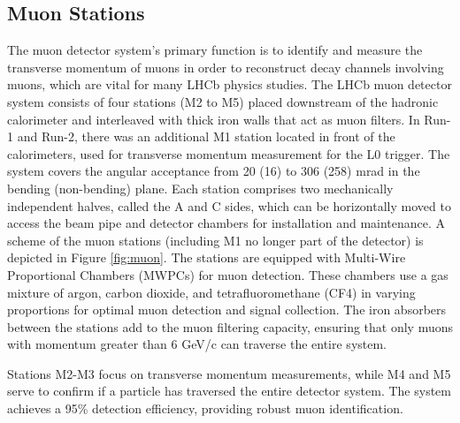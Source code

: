 \subsection{Muon Stations}
The muon detector system's primary function is to identify and measure the transverse momentum of muons in order to reconstruct decay channels involving muons, which are vital for many LHCb physics studies.
The LHCb muon detector system\cite{Alves_2013} consists of four stations (M2 to M5) placed downstream of the hadronic calorimeter and interleaved with thick iron walls that act as muon filters. In Run-1 and Run-2, there was an additional M1 station located in front of the calorimeters, used for transverse momentum measurement for the L0 trigger\cite{muon_upgrade}. The system covers the angular acceptance from 20 (16) to 306 (258) mrad in the bending (non-bending) plane. Each station comprises two mechanically independent halves, called the A and C sides, which can be horizontally moved to access the beam pipe and detector chambers for installation and maintenance.
A scheme of the muon stations (including M1 no longer part of the detector) is depicted in Figure \ref{fig:muon}.
The stations are equipped with Multi-Wire Proportional Chambers (MWPCs) for muon detection. These chambers use a gas mixture of argon, carbon dioxide, and tetrafluoromethane (CF4) in varying proportions for optimal muon detection and signal collection. The iron absorbers between the stations add to the muon filtering capacity, ensuring that only muons with momentum greater than 6 GeV/c can traverse the entire system.

Stations M2-M3 focus on transverse momentum measurements, while M4 and M5 serve to confirm if a particle has traversed the entire detector system. The system achieves a 95\% detection efficiency, providing robust muon identification. 

